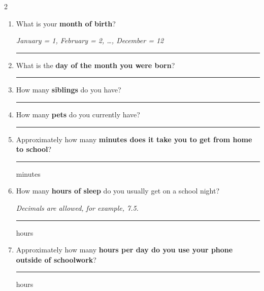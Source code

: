 	\noindent
	\hspace*{-0.99cm}%
	\begin{minipage}{\dimexpr\textwidth+0.5cm\relax}
		\begin{multicols}{2}
			\begin{enumerate}
				
				\item What is your \textbf{month of birth}?
				
				\textit{January = 1, February = 2, \ldots, December = 12}
				
				{\centering
					\rule{3cm}{0.4pt}\par
				}
				
				\item What is the \textbf{day of the month you were born}?
				
				{\centering
					\rule{3cm}{0.4pt}\par
				}
				
				\item How many \textbf{siblings} do you have?
				
				{\centering
					\rule{3cm}{0.4pt}\par
				}
				
				\item How many \textbf{pets} do you currently have?
				
				{\centering
					\rule{3cm}{0.4pt}\par
				}
				
				\item Approximately how many \textbf{minutes does it take you to get from home to school}?
				
				{\centering
					\rule{3cm}{0.4pt} minutes\par
				}
				
				\item How many \textbf{hours of sleep} do you usually get on a school night?
				
				\textit{Decimals are allowed, for example, 7.5.}
				
				{\centering
					\rule{3cm}{0.4pt} hours\par
				}
				
				\item Approximately how many \textbf{hours per day do you use your phone outside of schoolwork}?
				
				{\centering
					\rule{3cm}{0.4pt} hours\par
				}
				

\end{enumerate}
\end{multicols}
\end{minipage}
